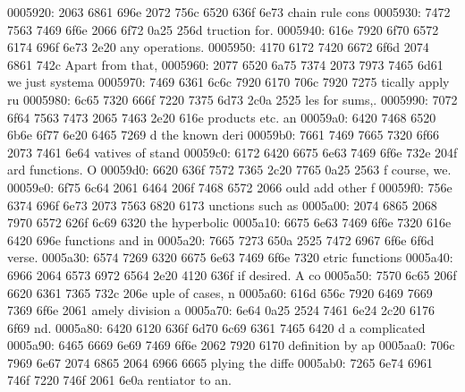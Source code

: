 \begin{bo
00010e0: 7865 647d 5c62 6567 696e 7b76 6572 6261  xed}
\begin{verba
00010f0: 7469 6d7d 0a20 2023 7479 7065 2074 6572  tim}
\begin{
0001c40: 7665 7262 6174 696d 7d0a 2020 236c 6574  verbatim}
\begin{boxe
00027a0: 647d 5c62 6567 696e 7b76 6572 6261 7469  d}
\begin{verbati
00027b0: 6d7d 0a20 2023 6c65 7420 696e 6669 7865  m}
\begin{v
0002c60: 6572 6261 7469 6d7d 0a20 2023 6c65 7420  erbatim}
\begin{
0002dc0: 7665 7262 6174 696d 7d0a 2020 236c 6574  verbatim}
\begin{boxed
0002f30: 7d5c 6265 6769 6e7b 7665 7262 6174 696d  }
\begin{verbatim
0002f40: 7d0a 2020 236c 6574 2068 6428 683a 3a74  }
\begin{v
0003e60: 6572 6261 7469 6d7d 0a20 2023 236f 7065  erbatim}
\begin{boxed
00042b0: 7d5c 6265 6769 6e7b 7665 7262 6174 696d  }
\begin{verbatim
00042c0: 7d0a 2020 2328 782c 7429 3b3b 0a20 202d  }
\begin{boxed}
\begin{boxed}
0005920: 2063 6861 696e 2072 756c 6520 636f 6e73   chain rule cons
0005930: 7472 7563 7469 6f6e 2066 6f72 0a25 256d  truction for.%
0005940: 616e 7920 6f70 6572 6174 696f 6e73 2e20  any operations. 
0005950: 4170 6172 7420 6672 6f6d 2074 6861 742c  Apart from that,
0005960: 2077 6520 6a75 7374 2073 7973 7465 6d61   we just systema
0005970: 7469 6361 6c6c 7920 6170 706c 7920 7275  tically apply ru
0005980: 6c65 7320 666f 7220 7375 6d73 2c0a 2525  les for sums,.%
0005990: 7072 6f64 7563 7473 2065 7463 2e20 616e  products etc. an
00059a0: 6420 7468 6520 6b6e 6f77 6e20 6465 7269  d the known deri
00059b0: 7661 7469 7665 7320 6f66 2073 7461 6e64  vatives of stand
00059c0: 6172 6420 6675 6e63 7469 6f6e 732e 204f  ard functions. O
00059d0: 6620 636f 7572 7365 2c20 7765 0a25 2563  f course, we.%
00059e0: 6f75 6c64 2061 6464 206f 7468 6572 2066  ould add other f
00059f0: 756e 6374 696f 6e73 2073 7563 6820 6173  unctions such as
0005a00: 2074 6865 2068 7970 6572 626f 6c69 6320   the hyperbolic 
0005a10: 6675 6e63 7469 6f6e 7320 616e 6420 696e  functions and in
0005a20: 7665 7273 650a 2525 7472 6967 6f6e 6f6d  verse.%
0005a30: 6574 7269 6320 6675 6e63 7469 6f6e 7320  etric functions 
0005a40: 6966 2064 6573 6972 6564 2e20 4120 636f  if desired. A co
0005a50: 7570 6c65 206f 6620 6361 7365 732c 206e  uple of cases, n
0005a60: 616d 656c 7920 6469 7669 7369 6f6e 2061  amely division a
0005a70: 6e64 0a25 2524 7461 6e24 2c20 6176 6f69  nd.%
0005a80: 6420 6120 636f 6d70 6c69 6361 7465 6420  d a complicated 
0005a90: 6465 6669 6e69 7469 6f6e 2062 7920 6170  definition by ap
0005aa0: 706c 7969 6e67 2074 6865 2064 6966 6665  plying the diffe
0005ab0: 7265 6e74 6961 746f 7220 746f 2061 6e0a  rentiator to an.

\end{boxed}
\end{boxed}
\end{verbatim
00042c0: 7d0a 2020 2328 782c 7429 3b3b 0a20 202d  }
\end{boxed
00042b0: 7d5c 6265 6769 6e7b 7665 7262 6174 696d  }
\end{v
0003e60: 6572 6261 7469 6d7d 0a20 2023 236f 7065  erbatim}
\end{verbatim
0002f40: 7d0a 2020 236c 6574 2068 6428 683a 3a74  }
\end{boxed
0002f30: 7d5c 6265 6769 6e7b 7665 7262 6174 696d  }
\end{
0002dc0: 7665 7262 6174 696d 7d0a 2020 236c 6574  verbatim}
\end{v
0002c60: 6572 6261 7469 6d7d 0a20 2023 6c65 7420  erbatim}
\end{verbati
00027b0: 6d7d 0a20 2023 6c65 7420 696e 6669 7865  m}
\end{boxe
00027a0: 647d 5c62 6567 696e 7b76 6572 6261 7469  d}
\end{
0001c40: 7665 7262 6174 696d 7d0a 2020 236c 6574  verbatim}
\end{verba
00010f0: 7469 6d7d 0a20 2023 7479 7065 2074 6572  tim}
\end{bo
00010e0: 7865 647d 5c62 6567 696e 7b76 6572 6261  xed}
